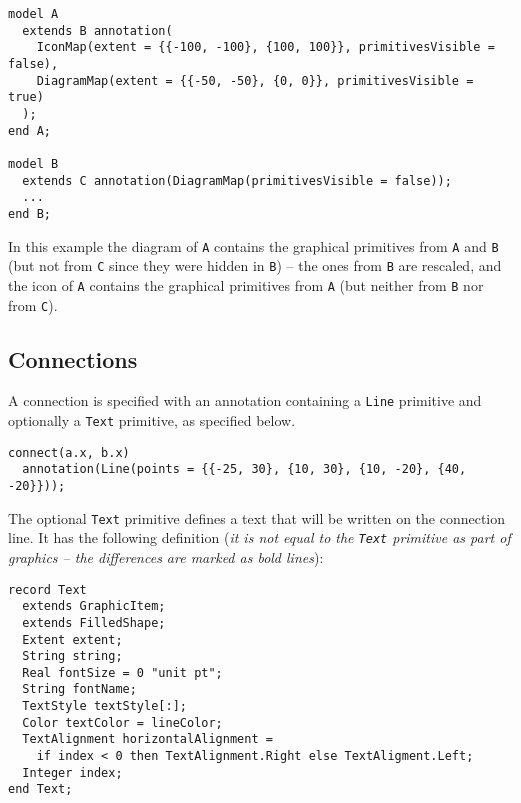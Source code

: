 \begin{example}
\begin{lstlisting}[language=modelica]
model A
  extends B annotation(
    IconMap(extent = {{-100, -100}, {100, 100}}, primitivesVisible = false),
    DiagramMap(extent = {{-50, -50}, {0, 0}}, primitivesVisible = true)
  );
end A;

model B
  extends C annotation(DiagramMap(primitivesVisible = false));
  ...
end B;
\end{lstlisting}
In this example the diagram of \lstinline!A! contains the graphical primitives
from \lstinline!A! and \lstinline!B! (but not from \lstinline!C! since they were hidden in \lstinline!B!) -- the ones
from \lstinline!B! are rescaled, and the icon of \lstinline!A! contains the graphical primitives
from \lstinline!A! (but neither from \lstinline!B! nor from \lstinline!C!).
\end{example}

\subsection{Connections}\label{connections1}

A connection is specified with an annotation containing a \lstinline!Line! primitive and optionally a \lstinline!Text! primitive, as specified below.

\begin{example}
\begin{lstlisting}[language=modelica]
connect(a.x, b.x)
  annotation(Line(points = {{-25, 30}, {10, 30}, {10, -20}, {40, -20}}));
\end{lstlisting}
\end{example}

The optional \lstinline!Text! primitive defines a text that will be written on the connection line.
It has the following definition (\emph{it is not equal to the \lstinline!Text! primitive as part of graphics -- the differences are marked as bold lines}):
\begin{lstlisting}[language=modelica]
record Text
  extends GraphicItem;
  extends FilledShape;
  Extent extent;
  String string;
  Real fontSize = 0 "unit pt";
  String fontName;
  TextStyle textStyle[:];
  Color textColor = lineColor;
  TextAlignment horizontalAlignment =
    if index < 0 then TextAlignment.Right else TextAligment.Left;
  Integer index;
end Text;
\end{lstlisting}

